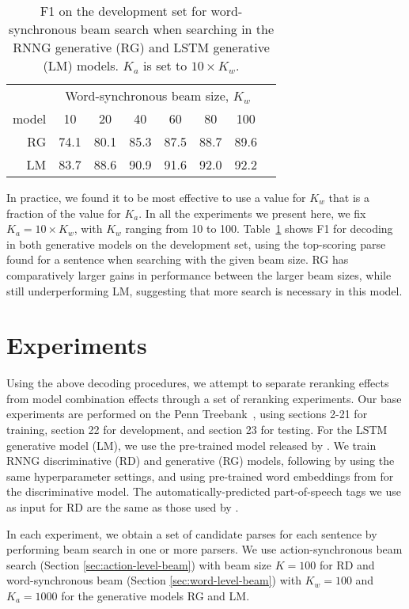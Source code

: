 \documentclass[11pt,a4paper]{article}
\newcommand{\lstm}{\textsc{LM}\xspace}
\newcommand{\rnngg}{\textsc{RG}\xspace}
\begin{document}
\begin{table}
\centering
\begin{tabular}{r|ccccccc}
& \multicolumn{6}{c}{Word-synchronous beam size, $K_w$} \\
model &  10 & 20 & 40 & 60 & 80 & 100 \\
\hline
\rnngg & 74.1 & 80.1 & 85.3 & 87.5 & 88.7 & 89.6\\
\lstm & 83.7 & 88.6 & 90.9 & 91.6 & 92.0 & 92.2 \\
\end{tabular}
\caption{\label{tab:beam_size}F1 on the development set for word-synchronous beam search when searching in the RNNG generative (RG) and LSTM generative (LM) models. $K_a$ is set to $10 \times K_w$.}
\vspace{-1em}
\end{table}

In practice, we found it to be most effective to use a value for $K_w$ that is a fraction of the value for $K_a$. In all the experiments we present here, we fix $K_a = 10 \times K_w$, with $K_w$ ranging from 10 to 100.
Table~\ref{tab:beam_size} shows F1 for decoding in both generative models on the development set, using the top-scoring parse found for a sentence when searching with the given beam size. RG has comparatively larger gains in performance between the larger beam sizes, while still underperforming LM, suggesting that more search is necessary in this model.

\section{Experiments}

Using the above decoding procedures, we attempt to separate reranking effects from model combination effects through a set of reranking experiments. Our base experiments are performed on the Penn Treebank~\cite{marcus1993building}, using sections \mbox{2-21} for training, section 22 for development, and section 23 for testing. For the LSTM generative model (LM), we use the pre-trained model released by \citet{Choe16Parsing}. We train RNNG discriminative (RD) and generative (RG) models, following \citet{dyer2016recurrent} by using the same hyperparameter settings, and using pre-trained word embeddings from \citet{ling2015two} for the discriminative model. The automatically-predicted part-of-speech tags we use as input for RD are the same as those used by \citet{Cross16Span}.

In each experiment, we obtain a set of candidate parses for each sentence by performing beam search in one or more parsers. We use  action-synchronous beam search (Section \ref{sec:action-level-beam}) with beam size $K = 100$ for RD and word-synchronous beam (Section \ref{sec:word-level-beam}) with $K_w = 100$ and $K_a = 1000$ for the generative models RG and LM. 
\end{document}
